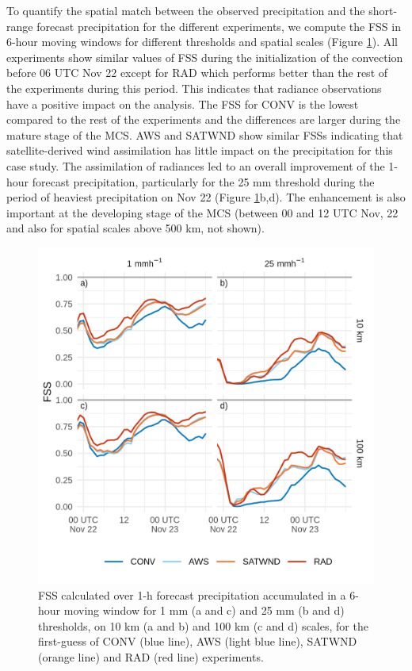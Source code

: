 \documentclass[final,5p,times,twocolumn,authoryear]{elsarticle} %
\begin{document}
To quantify the spatial match between the observed precipitation and the short-range forecast precipitation for the different experiments, we compute the FSS in 6-hour moving windows for different thresholds and spatial scales (Figure \ref{fig:fss}). All experiments show similar values of FSS during the initialization of the convection before 06 UTC Nov 22 except for RAD which performs better than the rest of the experiments during this period. This indicates that radiance observations have a positive impact on the analysis. The FSS for CONV is the lowest compared to the rest of the experiments and the differences are larger during the mature stage of the MCS. AWS and SATWND show similar FSSs indicating that satellite-derived wind assimilation has little impact on the precipitation for this case study. The assimilation of radiances led to an overall improvement of the 1-hour forecast precipitation, particularly for the 25 mm threshold during the period of heaviest precipitation on Nov 22 (Figure \ref{fig:fss}b,d). The enhancement is also important at the developing stage of the MCS (between 00 and 12 UTC Nov, 22 and also for spatial scales above 500 km, not shown).



\begin{figure}
\centering
\includegraphics{../figures/fss-1.png}
\caption{\label{fig:fss}FSS calculated over 1-h forecast precipitation accumulated in a 6-hour moving window for 1 mm (a and c) and 25 mm (b and d) thresholds, on 10 km (a and b) and 100 km (c and d) scales, for the first-guess of CONV (blue line), AWS (light blue line), SATWND (orange line) and RAD (red line) experiments.}
\end{figure}
\end{document}
